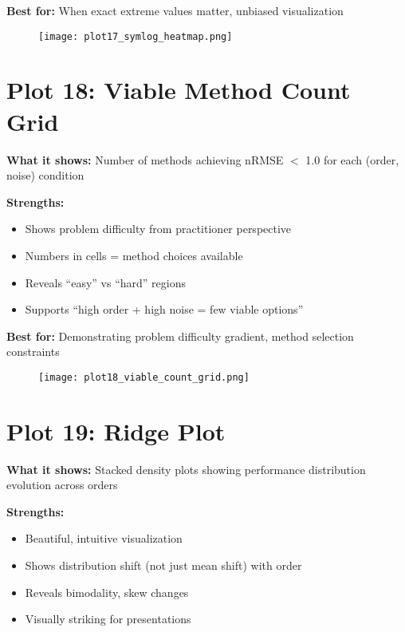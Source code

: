 \documentclass[11pt]{article}
\begin{document}
\textbf{Best for:} When exact extreme values matter, unbiased visualization

\begin{figure}[h]
\centering
\texttt{[image: plot17\_symlog\_heatmap.png]}
\end{figure}

\clearpage


\section*{Plot 18: Viable Method Count Grid}

\textbf{What it shows:} Number of methods achieving nRMSE $<$ 1.0 for each (order, noise) condition

\textbf{Strengths:}
\begin{itemize}
    \item Shows problem difficulty from practitioner perspective
    \item Numbers in cells = method choices available
    \item Reveals ``easy'' vs ``hard'' regions
    \item Supports ``high order + high noise = few viable options''
\end{itemize}

\textbf{Best for:} Demonstrating problem difficulty gradient, method selection constraints

\begin{figure}[h]
\centering
\texttt{[image: plot18\_viable\_count\_grid.png]}
\end{figure}

\clearpage


\section*{Plot 19: Ridge Plot}

\textbf{What it shows:} Stacked density plots showing performance distribution evolution across orders

\textbf{Strengths:}
\begin{itemize}
    \item Beautiful, intuitive visualization
    \item Shows distribution shift (not just mean shift) with order
    \item Reveals bimodality, skew changes
    \item Visually striking for presentations
\end{itemize}
\end{document}
